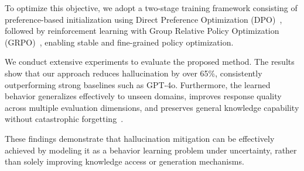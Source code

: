 To optimize this objective, we adopt a two-stage training framework consisting of preference-based initialization using Direct Preference Optimization (DPO)~\cite{dpo}, followed by reinforcement learning with Group Relative Policy Optimization (GRPO)~\cite{GRPO}, enabling stable and fine-grained policy optimization.

We conduct extensive experiments to evaluate the proposed method. 
The results show that our approach reduces hallucination by over 65\%, consistently outperforming strong baselines such as GPT-4o. 
Furthermore, the learned behavior generalizes effectively to unseen domains, improves response quality across multiple evaluation dimensions, and preserves general knowledge capability without catastrophic forgetting~\cite{EWC}.

These findings demonstrate that hallucination mitigation can be effectively achieved by modeling it as a behavior learning problem under uncertainty, rather than solely improving knowledge access or generation mechanisms.